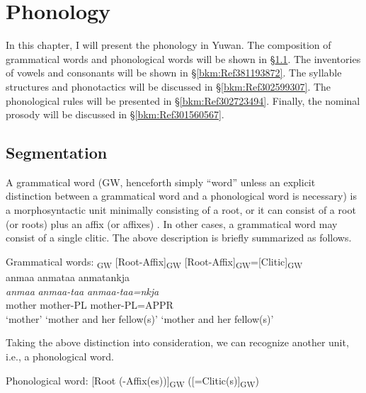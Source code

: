 \chapter{Phonology}\label{chap:2}
\hypertarget{RefHeadingToc395696960}{}
In this chapter, I will present the phonology in Yuwan. The composition of grammatical words and phonological words will be shown in §\ref{bkm:Ref381193780}. The inventories of vowels and consonants will be shown in §\ref{bkm:Ref381193872}. The syllable structures and phonotactics will be discussed in §\ref{bkm:Ref302599307}. The phonological rules will be presented in §\ref{bkm:Ref302723494}. Finally, the nominal prosody will be discussed in §\ref{bkm:Ref301560567}.

\section{Segmentation}
\label{bkm:Ref381193780}\hypertarget{RefHeadingToc395696961}{}\label{bkm:Ref347179371}
A grammatical word (GW, henceforth simply “word” unless an explicit distinction between a grammatical word and a phonological word is necessary) is a morphosyntactic unit minimally consisting of a root, or it can consist of a root (or roots) plus an affix (or affixes) \citep[cf.][]{DixonAikhenvald2002}. In other cases, a grammatical word may consist of a single clitic. The above description is briefly summarized as follows.

\ea Grammatical words: \glllll\relax
[Root]\textsubscript{GW} [Root-Affix]\textsubscript{GW} [Root-Affix]\textsubscript{GW}=[Clitic]\textsubscript{GW}\\
anmaa anmataa anmatankja\footnotemark{}\\
{\itshape anmaa} {\itshape anmaa-taa} {\itshape anmaa-taa=nkja}\\
mother mother-PL mother-PL=APPR\\
‘mother’ ‘mother and her fellow(s)’ ‘mother and her fellow(s)’\\
\z
{}

\noindent Taking the above distinction into consideration, we can recognize another unit, i.e., a phonological word.

\ea Phonological word: [Root (-Affix(es))]\textsubscript{GW} ([=Clitic(s)]\textsubscript{GW}) \z

